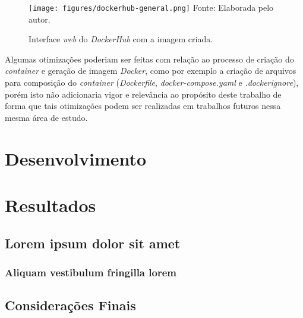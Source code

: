 \documentclass[
  12pt,				%
  openright,			%
  twoside,			%
  a4paper,			%
  english,			%
  french,				%
  spanish,			%
  brazil,				%
  ]{abntex2}
\begin{document}
\begin{figure}[!htb]
  \centering
  \caption{Interface \textit{web} do \textit{DockerHub} com a imagem criada.}
  \texttt{[image: figures/dockerhub-general.png]}
  Fonte: Elaborada pelo autor.
  \label{fig:dockerhub-general}
\end{figure}

Algumas otimizações poderiam ser feitas com relação ao processo de criação do \textit{container} e geração de imagem \textit{Docker}, como por exemplo a criação
de arquivos para composição do \textit{container} (\textit{Dockerfile}, \textit{docker-compose.yaml} e \textit{.dockerignore}), porém isto
não adicionaria vigor e relevância ao propósito deste trabalho de forma que tais otimizações podem ser realizadas em trabalhos futuros nessa mesma
área de estudo.

\part{Desenvolvimento}

\part{Resultados}

\chapter{Lorem ipsum dolor sit amet}

\section{Aliquam vestibulum fringilla lorem}

\lipsum[1]

\lipsum[2-3]


\chapter{Considerações Finais}
\end{document}
